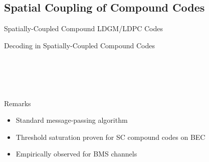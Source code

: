 \documentclass[10pt,presentation]{beamer}
\def\side_information_path{../compound-codes/isit14/slides/Figures}
\begin{document}
\subsection{Spatial Coupling of Compound Codes}
\begin{frame}{Spatially-Coupled Compound LDGM/LDPC Codes}
  \begin{center}
    \scalebox{0.8}{}
  \end{center}
\end{frame}

\begin{frame}{Decoding in Spatially-Coupled Compound Codes}
  \begin{columns}
    \setlength\tikzheight{5cm}
    \setlength\tikzwidth{6cm}
    \scalebox{0.5}{}

    \scalebox{0.5}{}\\ \vspace{0.3cm}
    \scalebox{0.5}{}\\ \vspace{0.3cm}
    \scalebox{0.5}{}
  \end{columns}
  \begin{block}{Remarks}
    \begin{itemize}
    \item Standard message-passing algorithm
    \item Threshold saturation proven for SC compound codes on BEC
    \item Empirically observed for BMS channels
    \end{itemize}
  \end{block}
\end{frame}
\end{document}
